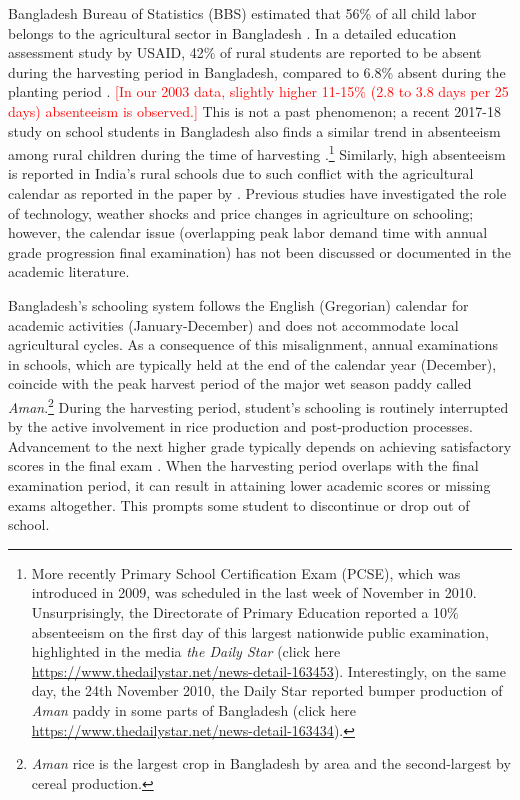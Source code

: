 \documentclass[12pt,letterpaper]{article}
\newcommand{\SAdded}[1]{\textcolor{red}{#1}}
\newcommand{\0}{\ensuremath{\mbox{\boldmath $0$}}}
\begin{document}
Bangladesh Bureau of Statistics (BBS) estimated that 56\% of all child labor belongs to the agricultural sector in Bangladesh \citep{bbs2003report}. In a detailed education assessment study by USAID, 42\% of rural students are reported to be absent during the harvesting period in Bangladesh, compared to 6.8\% absent during the planting period \citep[][Table IV.D.9, page 110]{Rahman2004}. \SAdded{[In our 2003 data, slightly higher 11-15\% (2.8 to 3.8 days per 25 days) absenteeism is observed.]} This is not a past phenomenon; a recent 2017-18 study on school students in Bangladesh also finds a similar trend in absenteeism among rural children during the time of harvesting \citep{Fujii2019}.\footnote{More recently Primary School Certification Exam (PCSE), which was introduced in 2009, was scheduled in the last week of November in 2010. Unsurprisingly, the Directorate of Primary Education reported a 10$\%$ absenteeism on the first day of this largest nationwide public examination, highlighted in the media \textit{the Daily Star} (click here \url{https://www.thedailystar.net/news-detail-163453}). Interestingly, on the same day, the 24th November 2010, the Daily Star reported bumper production of \textit{Aman} paddy in some parts of Bangladesh (click here \url{https://www.thedailystar.net/news-detail-163434}). } Similarly, high absenteeism is reported in India's rural schools due to such conflict with the agricultural calendar as reported in the paper by \cite{de2016estimating}. Previous studies have investigated the role of technology, weather shocks and price changes in agriculture on schooling; however, the calendar issue (overlapping peak labor demand time with annual grade progression final examination) has not been discussed or documented in the academic literature.

Bangladesh's schooling system follows the English (Gregorian) calendar for academic activities (January-December) and does not accommodate local agricultural cycles. As a consequence of this misalignment, annual examinations in schools, which are typically held at the end of the calendar year (December), coincide with the peak harvest period of the major wet season paddy called \textit{Aman}.\footnote{\textit{Aman} rice is the largest crop in Bangladesh by area and the second-largest by cereal production.} During the harvesting period, student's schooling is routinely interrupted by the active involvement in rice production and post-production processes. Advancement to the next higher grade typically depends on achieving satisfactory scores in the final exam \citep{ADB2017}. When the harvesting period overlaps with the final examination period, it can result in attaining lower academic scores or missing exams altogether. This prompts some student to discontinue or drop out of school. 
\end{document}

